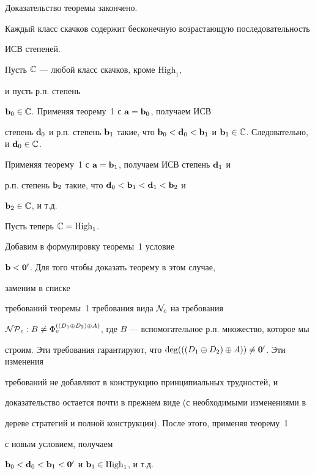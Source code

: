 Доказательство теоремы закончено.


\setcounter{sled}{0}


\begin{sled}


Каждый класс скачков содержит бесконечную возрастающую последовательность


ИСВ \pp степеней.


\end{sled}





\begin{pf}


Пусть $\Bbb C$ --- любой класс скачков, кроме $\text{High}_1$,


и пусть р.п. степень


${\bold b_0}\in\Bbb C$. Применяя теорему~1 с ${\bold a}={\bold b_0}$, получаем ИСВ


\pp степень $\dg{d_0}$ и р.п. степень $\dg{b_1}$ такие, что $\dg{b_0}<\dg{d_0}<


\dg{b_1}$ и $\dg{b_1}\in\Bbb C$. Следовательно, и $\dg{d_0}\in\Bbb C$.


Применяя теорему~1 с ${\bold a}={\bold b_1}$, получаем ИСВ \pp степень ${\bold d_1}$ и


р.п. степень ${\bold b_2}$ такие, что ${\bold d_0}<{\bold b_1}<{\bold d_1}<{\bold b_2}$ и


${\bold b_2}\in\Bbb C$, и т.д.





Пусть теперь ${\Bbb C}=\text{High}_1$.


Добавим в формулировку теоремы~1 условие


${\bold b}<{\bold 0'}$. Для того чтобы доказать теорему в этом случае, 


заменим в списке


требований теоремы~1 требования вида ${\cal N}_e$ на требования


${\cal N\cal P}_e:


B\ne\Phi_e^{\psum}$, где $B$ --- вспомогательное р.п. множество, которое мы


строим. Эти требования гарантируют, что $\deg(((D_1\oplus D_2)\oplus A))\ne{\bold 0'}$. Эти изменения


требований не добавляют в конструкцию принципиальных трудностей, и


доказательство остается почти в прежнем виде (с необходимыми изменениями в


дереве стратегий и полной конструкции). После этого, применяя теорему~1


с новым условием, получаем


$\dg{b_0}<\dg{d_0}<\dg{b_1}<\dg{0'}$ и $\dg{b_1}\in


\text{High}_1$, и т.д.


\end{pf}





